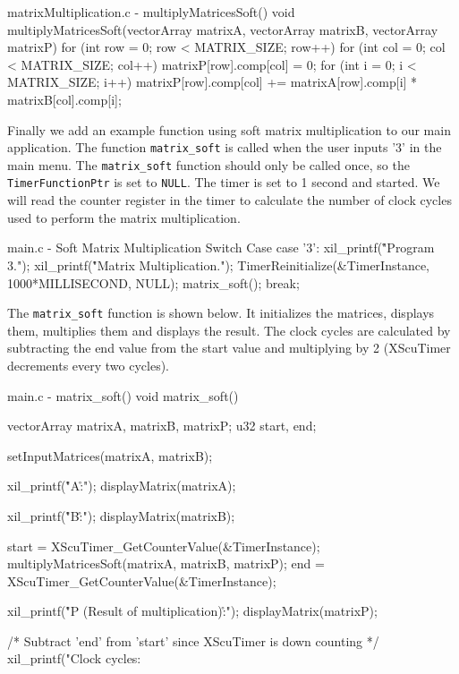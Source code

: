 \documentclass[../main.tex]{subfiles}
\begin{document}
\begin{myminted}{matrixMultiplication.c - multiplyMatricesSoft()}
void multiplyMatricesSoft(vectorArray matrixA, vectorArray matrixB, vectorArray matrixP)
{ 
    for (int row = 0; row < MATRIX_SIZE; row++) {
        for (int col = 0; col < MATRIX_SIZE; col++) {
            matrixP[row].comp[col] = 0;
            for (int i = 0; i < MATRIX_SIZE; i++) {
                matrixP[row].comp[col] += matrixA[row].comp[i] * matrixB[col].comp[i];
            }
        }
    }
}    
\end{myminted}

\newpage

Finally we add an example function using soft matrix multiplication to our main application. The function \texttt{matrix\_soft} is called when the user inputs '3' in the main menu. The \texttt{matrix\_soft} function should only be called once, so the \texttt{TimerFunctionPtr} is set to \texttt{NULL}. The timer is set to 1 second and started. We will read the counter register in the timer to calculate the number of clock cycles used to perform the matrix multiplication.

\begin{myminted}{main.c - Soft Matrix Multiplication Switch Case}
case '3':
    xil_printf("\r\nStarting Program 3.");
    xil_printf("\r\nSoft Matrix Multiplication.");
    TimerReinitialize(&TimerInstance, 1000*MILLISECOND, NULL);
    matrix_soft();
    break;
\end{myminted}

The \texttt{matrix\_soft} function is shown below. It initializes the matrices, displays them, multiplies them and displays the result. The clock cycles are calculated by subtracting the end value from the start value and multiplying by 2 (XScuTimer decrements every two cycles).

\begin{myminted}{main.c - matrix\_soft()}
void matrix_soft()
{
    vectorArray matrixA, matrixB, matrixP;
    u32 start, end;

    setInputMatrices(matrixA, matrixB);

    xil_printf("\r\n\nMatrix A:\r\n");
    displayMatrix(matrixA);

    xil_printf("\r\n\nMatrix B:\r\n");
    displayMatrix(matrixB);

    start = XScuTimer_GetCounterValue(&TimerInstance);
    multiplyMatricesSoft(matrixA, matrixB, matrixP);
    end = XScuTimer_GetCounterValue(&TimerInstance);

    xil_printf("\r\n\nMatrix P (Result of multiplication):\r\n");
    displayMatrix(matrixP);

    /* Subtract 'end' from 'start' since XScuTimer is down counting */
    xil_printf("Clock cycles: %
}
\end{myminted}
\end{document}
